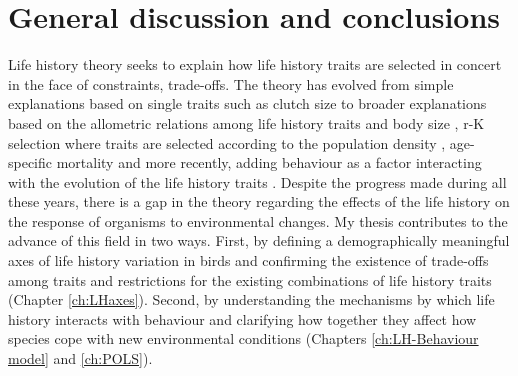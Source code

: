 \chapter{General discussion and conclusions}\label{ch:discussion}

Life history theory seeks to explain how life history traits are selected in
concert in the face of constraints, trade-offs.
The theory has evolved from simple explanations based on single traits such as
clutch size \citep{Lack1946,Skutch1949} to broader explanations based on the
allometric relations among life history traits and body size
\citep{Western1979}, r-K selection where traits are selected according to the
population density \citep{Pianka1970}, age-specific mortality
\citep{Gadgil1970,Stearns1976,Charlesworth1980} and more recently, adding
behaviour as a factor interacting with the evolution of the life history traits
\citep{Ricklefs2002,Reale2010a,Sol2016}.
Despite the progress made during all these years, there is a gap in the theory
regarding the effects of the life history on the response of organisms to
environmental changes.
My thesis contributes to the advance of this field in two ways.
First, by defining a demographically meaningful axes of life history variation
in birds and confirming the existence of trade-offs among traits and
restrictions for the existing combinations of life history traits (Chapter
\ref{ch:LHaxes}).
Second, by understanding the mechanisms by which life history interacts with
behaviour and clarifying how together they affect how species cope with new
environmental conditions (Chapters \ref{ch:LH-Behaviour model} and
\ref{ch:POLS}).

\bigskip

